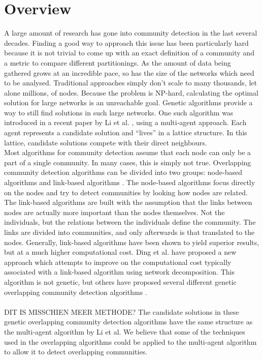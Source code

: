 \documentclass[twoside,twocolumn]{article}
\begin{document}
\section{Overview}
A large amount of research has gone into community detection in the last several decades. Finding a good way to approach this issue has been particularly hard because it is not trivial to come up with an exact definition of a community and a metric to compare different partitionings. As the amount of data being gathered grows at an incredible pace, so has the size of the networks which need to be analysed. Traditional approaches simply don't scale to many thousands, let alone millions, of nodes. Because the problem is NP-hard, calculating the optimal solution for large networks is an unreachable goal. Genetic algorithms provide a way to still find solutions in such large networks. One such algorithm was introduced in a recent paper by Li et al. \cite{multiagent2016}, using a multi-agent approach. Each agent represents a candidate solution and ``lives'' in a lattice structure. In this lattice, candidate solutions compete with their direct neighbours. \\
Most algorithms for community detection assume that each node can only be a part of a single community. In many cases, this is simply not true. Overlapping community detection algorithms can be divided into two groups: node-based algorithms and link-based algorithms \cite{linkclus2013}. The node-based algorithms focus directly on the nodes and try to detect communities by looking how nodes are related. The link-based algorithms are built with the assumption that the links between nodes are actually more important than the nodes themselves. Not the individuals, but the relations between the individuals define the community. The links are divided into communities, and only afterwards is that translated to the nodes. Generally, link-based algorithms have been shown to yield superior results, but at a much higher computational cost. Ding et al. \cite{Ding2016} have proposed a new approach which attempts to improve on the computational cost typically associated with a link-based algorithm using network decomposition. This algorithm is not genetic,  but others have proposed several different genetic overlapping community detection algorithms \cite{linkclus2013,Pizzuti2009,Dickinson2013}.\\
\\
DIT IS MISSCHIEN MEER METHODE?
The candidate solutions in these genetic overlapping community detection algorithms have the same structure as the multi-agent algorithm by Li et al. We believe that some of the techniques used in the overlapping algorithms could be applied to the multi-agent algorithm to allow it to detect overlapping communities.
\end{document}
